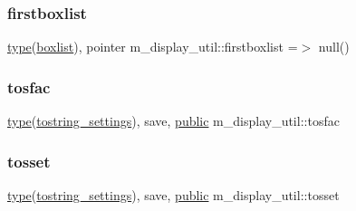 \mbox{\label{namespacem__display__util_af285f44a47c745fc4da9df4a73269ac2}} 
\subsubsection{\texorpdfstring{firstboxlist}{firstboxlist}}
{\footnotesize\ttfamily \hyperlink{stop__watch_83_8txt_a70f0ead91c32e25323c03265aa302c1c}{type}(\hyperlink{structm__display__util_1_1boxlist}{boxlist}), pointer m\+\_\+display\+\_\+util\+::firstboxlist =$>$ null()\hspace{0.3cm}{\ttfamily [private]}}

\mbox{\label{namespacem__display__util_a0bd80d23e6e5fec3979a3357f65fb5e3}} 
\subsubsection{\texorpdfstring{tosfac}{tosfac}}
{\footnotesize\ttfamily \hyperlink{stop__watch_83_8txt_a70f0ead91c32e25323c03265aa302c1c}{type}(\hyperlink{structm__display__util_1_1tostring__settings}{tostring\+\_\+settings}), save, \hyperlink{M__stopwatch_83_8txt_a2f74811300c361e53b430611a7d1769f}{public} m\+\_\+display\+\_\+util\+::tosfac}

\mbox{\label{namespacem__display__util_a5c904147cafd4110a901207d859bdf7b}} 
\subsubsection{\texorpdfstring{tosset}{tosset}}
{\footnotesize\ttfamily \hyperlink{stop__watch_83_8txt_a70f0ead91c32e25323c03265aa302c1c}{type}(\hyperlink{structm__display__util_1_1tostring__settings}{tostring\+\_\+settings}), save, \hyperlink{M__stopwatch_83_8txt_a2f74811300c361e53b430611a7d1769f}{public} m\+\_\+display\+\_\+util\+::tosset}


